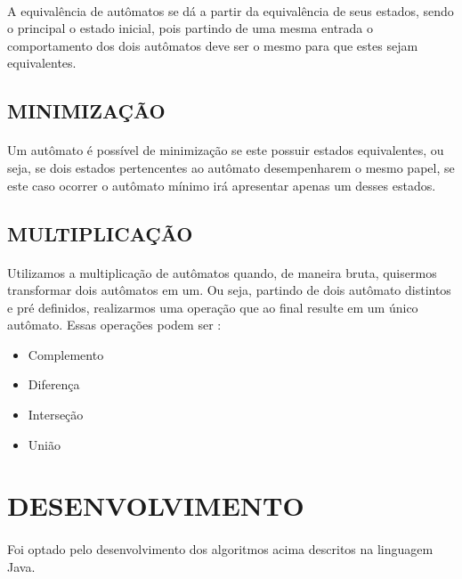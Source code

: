 \documentclass[a4paper,portuguese,12pt]{article}
\begin{document}
\paragraph{} A equivalência de autômatos se dá a partir da equivalência de seus estados, sendo o principal o estado inicial, pois partindo de uma mesma entrada o comportamento dos dois autômatos deve ser o mesmo para que estes sejam equivalentes.

\subsection{MINIMIZAÇÃO}

\paragraph{} Um autômato é possível de minimização se este possuir estados equivalentes, ou seja, se dois estados pertencentes ao autômato desempenharem o mesmo papel, se este caso ocorrer o autômato mínimo irá apresentar apenas um desses estados.

\subsection{MULTIPLICAÇÃO}

\paragraph{} Utilizamos a multiplicação de autômatos quando, de maneira bruta, quisermos transformar dois autômatos em um. Ou seja, partindo de dois autômato distintos e pré definidos, realizarmos uma operação que ao final resulte em um único autômato. Essas operações podem ser :

\begin{itemize}
\item Complemento
\item Diferença
\item Interseção
\item União
\end{itemize}

\section{DESENVOLVIMENTO}

\paragraph{} Foi optado pelo desenvolvimento dos algoritmos acima descritos na linguagem Java.
\end{document}
